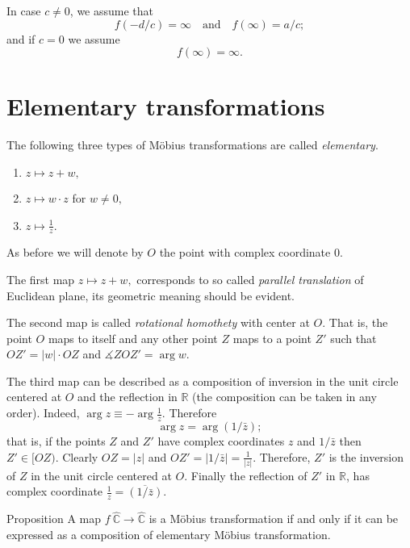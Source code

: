 In case $c\not=0$, we assume that
$$f(-d/c) = \infty
\quad
\text{and}
\quad
f(\infty) = a/c;$$
and if $c=0$ we assume
$$f(\infty) = \infty.$$





\section*{Elementary transformations}

The following three types of M\"obius transformations are called \emph{elementary}.

\begin{enumerate}
\item $z\mapsto z+w,$
\item $z\mapsto w\cdot z$ for $w\ne0,$
\item $z\mapsto \frac1z.$
\end{enumerate}
 
As before we will denote by $O$ the point with complex coordinate $0$.

The first map $z\mapsto z+w,$ corresponds to so called 
\emph{parallel translation} 
of Euclidean plane, its geometric meaning should be evident.

The second map is called \emph{rotational homothety} with center at $O$.
That is, the point $O$ maps to itself
and any other point $Z$ maps to a point $Z'$ such that $OZ'=|w|\cdot OZ$ and $\measuredangle ZOZ'=\arg w$.

The third map can be described as a composition of inversion in the unit circle centered at $O$ and the reflection in $\mathbb{R}$ 
(the composition can be taken in any order).
Indeed, $\arg z\equiv -\arg \tfrac1z$.
Therefore 
$$\arg z=\arg (1/\bar z);$$
that is, if the points $Z$ and $Z'$ have complex coordinates $z$ and $1/\bar z$
then $Z'\in[OZ)$.
Clearly $OZ=|z|$ and $OZ'=|1/\bar z|=\tfrac{1}{|z|}$.
Therefore, $Z'$ is the inversion of $Z$ in the unit circle centered at $O$.
Finally the reflection of $Z'$ in $\mathbb{R}$, 
has complex coordinate $\tfrac1z=\overline{(1/\bar z)}$.

\begin{thm}{Proposition}\label{prop:mob-comp}
A map $f\:\hat{\mathbb{C}}\to\hat{\mathbb{C}}$ is a M\"obius transformation if and only if it can be expressed as a composition of elementary   M\"obius transformation. 
\end{thm}

